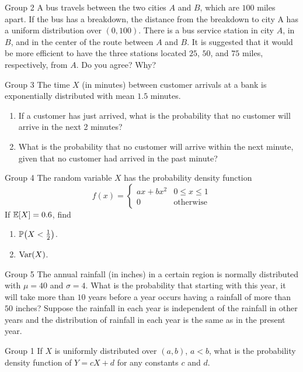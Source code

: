 \documentclass{article}
\begin{document}
\begin{problem}
    {Group 2}
    A bus travels between the two cities $A$ and $B$, which are $100$ miles apart. If the bus has a breakdown, the distance from the breakdown to city A has a uniform distribution over $(0, 100)$. There is a bus service station in city $A$, in $B$, and in the center of the route between $A$ and $B$. It is suggested that it would be more efficient to have the three stations located $25$, $50$, and $75$ miles, respectively, from $A$. Do you agree? Why?
\end{problem}

\begin{problem}
    {Group 3}
    The time $X$ (in minutes) between customer arrivals at a bank is exponentially distributed with mean $1.5$ minutes.
    \begin{enumerate}
        \item If a customer has just arrived, what is the probability         that no customer will arrive in the next 2 minutes?
        \item What is the probability that no customer will arrive within the next minute, given that no customer had arrived in the past minute?
    \end{enumerate}
\end{problem}

\begin{problem}
    {Group 4}
    The random variable $X$ has the probability density function
    \[f(x)={
        \begin{cases}
            ax+bx^2 & 0\leq x\leq 1\\
            0       & \text{otherwise}
        \end{cases}
    }\]
    If $\E{X}=0.6$, find
    \begin{enumerate}
        \item $\P{X<\frac{1}{2}}$.
        \item $\mathop{\mathrm{Var}}\nolimits(X)$.
    \end{enumerate}
\end{problem}

\begin{problem}
    {Group 5}
    The annual rainfall (in inches) in a certain region is normally distributed with $\mu = 40$ and $\sigma = 4$. What is the probability that starting with this year, it will take more than $10$ years before a year occurs having a rainfall of more than $50$ inches? Suppose the rainfall in each year is independent of the rainfall in other years and the distribution of rainfall in each year is the same as in the present year.
\end{problem}
\begin{problem}
    {Group 1}
    If $X$ is uniformly distributed over $(a, b)$, $a < b$, what is the probability density function of $Y = cX + d$ for any constants $c$ and $d$.
\end{problem}
\end{document}
